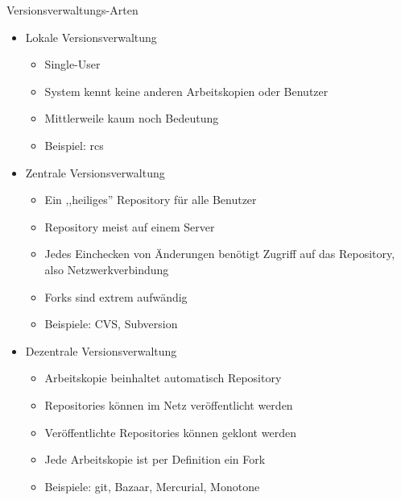 \begin{frame}[allowframebreaks]{Versionsverwaltungs-Arten}
  \begin{itemize}
    \item Lokale Versionsverwaltung
    \begin{itemize}
      \item Single-User
      \item System kennt keine anderen Arbeitskopien oder Benutzer
      \item Mittlerweile kaum noch Bedeutung
      \item Beispiel: rcs
    \end{itemize}
    \framebreak

    \item Zentrale Versionsverwaltung
    \begin{itemize}
      \item Ein ,,heiliges'' Repository für alle Benutzer
      \item Repository meist auf einem Server
      \item Jedes Einchecken von Änderungen benötigt Zugriff auf das Repository, also Netzwerkverbindung
      \item Forks sind extrem aufwändig
      \item Beispiele: CVS, Subversion
    \end{itemize}
    \framebreak

    \item Dezentrale Versionsverwaltung
    \begin{itemize}
      \item Arbeitskopie beinhaltet automatisch Repository
      \item Repositories können im Netz veröffentlicht werden
      \item Veröffentlichte Repositories können geklont werden
      \item Jede Arbeitskopie ist per Definition ein Fork
      \item Beispiele: git, Bazaar, Mercurial, Monotone
    \end{itemize}
  \end{itemize}
\end{frame}

